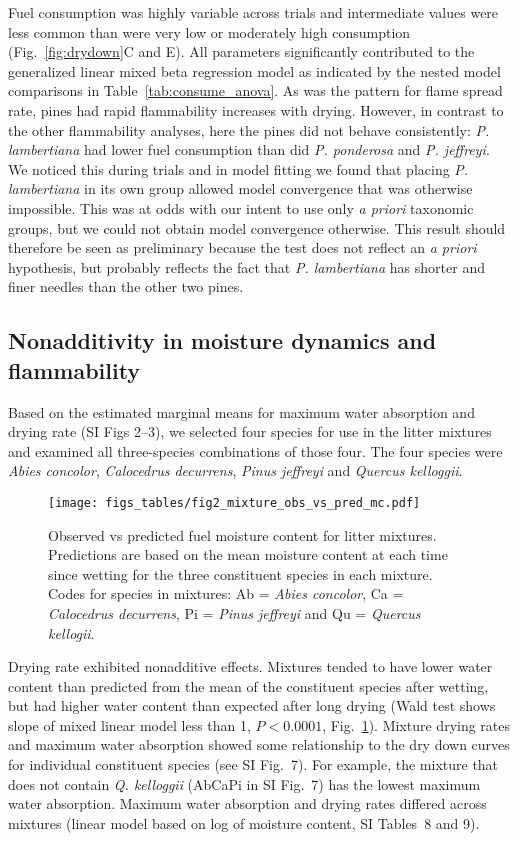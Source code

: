 \documentclass[letterpaper,12pt]{article}
\begin{document}
Fuel consumption was highly variable across trials and intermediate values were
less common than were very low or moderately high consumption
(Fig.~\ref{fig:drydown}C and E). All parameters significantly contributed to the
generalized linear mixed beta regression model as indicated by the nested model
comparisons in Table~\ref{tab:consume_anova}. As was the pattern for flame
spread rate, pines had rapid flammability increases with drying. However,
in contrast to the other flammability analyses, here the pines did not behave
consistently: \emph{P. lambertiana} had lower fuel consumption than did \emph{P.
  ponderosa} and \emph{P. jeffreyi}. We noticed this during trials and in model
fitting we found that placing \emph{P. lambertiana} in its own group allowed
model convergence that was otherwise impossible. This was at odds with our
intent to use only \emph{a priori} taxonomic groups, but we could not obtain
model convergence otherwise. This result should therefore be seen as
preliminary because the test does not reflect an \emph{a priori} hypothesis,
but probably reflects the fact that \emph{P. lambertiana} has shorter and finer
needles than the other two pines.

\subsection*{Nonadditivity in moisture dynamics and flammability}

Based on the estimated marginal means for maximum water absorption and drying
rate (SI Figs 2--3), we selected four species for use in the litter mixtures
and examined all three-species combinations of those four. The four species
were \emph{Abies concolor}, \emph{Calocedrus decurrens}, \emph{Pinus jeffreyi}
and \emph{Quercus kelloggii}.

\begin{figure}
  \centering
\texttt{[image: figs\_tables/fig2\_mixture\_obs\_vs\_pred\_mc.pdf]}
\caption{Observed vs predicted fuel moisture content for litter mixtures.
  Predictions are based on the mean moisture content at each time since wetting
  for the three constituent species in each mixture. Codes for species in
  mixtures: Ab = \emph{Abies concolor}, Ca = \emph{Calocedrus decurrens}, Pi =
  \emph{Pinus jeffreyi} and Qu = \emph{Quercus kellogii}.}
  \label{fig:mixture_obs_pred_mc}
\end{figure}


Drying rate exhibited nonadditive effects. Mixtures tended to have lower water
content than predicted from the mean of the constituent species after wetting,
but had higher water content than expected after long drying (Wald test shows
slope of mixed linear model less than 1, $P < 0.0001$,
Fig.~\ref{fig:mixture_obs_pred_mc}). Mixture drying rates and maximum water
absorption showed some relationship to the dry down curves for individual
constituent species (see SI Fig.~7). For example, the mixture that does not
contain \emph{Q. kelloggii} (AbCaPi in SI Fig.~7) has the lowest maximum water
absorption. Maximum water absorption and drying rates differed across mixtures
(linear model based on log of moisture content, SI Tables~8 and 9).
\end{document}
